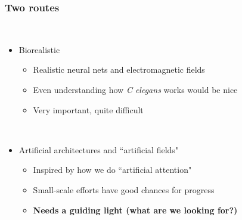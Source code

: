 \documentclass{beamer}
\begin{document}
\begin{frame}

  \frametitle{Two routes}

\ \\

\begin{itemize}

\item Biorealistic

\begin{itemize}

\item Realistic neural nets and electromagnetic fields

\item Even understanding how {\it C elegans} works would be nice

\item Very important, quite difficult 

\end{itemize}


\ \\

\item Artificial architectures and ``artificial fields"

\begin{itemize}

\item Inspired by how we do ``artificial attention"

\item Small-scale efforts have good chances for progress

\item {\bf Needs a guiding light (what are we looking for?)}

\end{itemize}

\end{itemize}

\end{frame}
\end{document}
